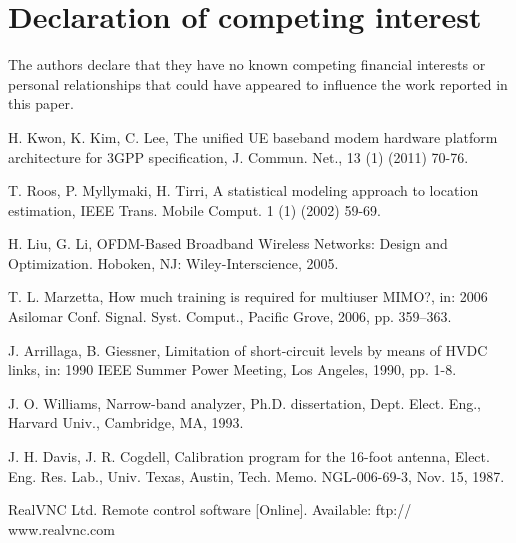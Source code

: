 \documentclass[final,3p,times,twocolumn]{elsarticle}
\begin{document}
\section*{Declaration of competing interest}
The authors declare that they have no known competing financial interests or personal relationships that could have appeared to influence the work reported in this paper.


% 
% 
% 
% 
% 
% 
% 
% 
% 
% 
% 
% 

\vspace{-0.3cm}

\begin{thebibliography}{1}

 H. Kwon, K. Kim, C. Lee, The unified UE baseband modem hardware platform architecture for 3GPP specification, J. Commun. Net., 13 (1) (2011) 70-76.

 T. Roos, P. Myllymaki, H. Tirri, A statistical modeling approach to location estimation, IEEE Trans. Mobile Comput. 1 (1) (2002) 59-69.

 H. Liu, G. Li, OFDM-Based Broadband Wireless Networks: Design and Optimization. Hoboken, NJ: Wiley-Interscience, 2005.

 T. L. Marzetta, How much training is required for multiuser MIMO?, in: 2006 Asilomar Conf. Signal. Syst. Comput., Pacific Grove, 2006, pp. 359–363.

 J. Arrillaga, B. Giessner, Limitation of short-circuit levels by means of HVDC links, in: 1990 IEEE Summer Power Meeting, Los Angeles, 1990, pp. 1-8.

 J. O. Williams, Narrow-band analyzer, Ph.D. dissertation, Dept. Elect. Eng., Harvard Univ., Cambridge, MA, 1993.

 J. H. Davis, J. R. Cogdell, Calibration program for the 16-foot antenna, Elect. Eng. Res. Lab., Univ. Texas, Austin, Tech. Memo. NGL-006-69-3, Nov. 15, 1987.

 RealVNC Ltd. Remote control software [Online]. Available: ftp:// www.realvnc.com


\end{thebibliography}
\end{document}
